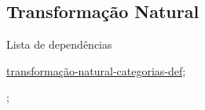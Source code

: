 \subsection{Transformação Natural}
\label{transformação-natural-categorias-ex}
\begin{titlemize}{Lista de dependências}
	\item \hyperref[transformação-natural-categorias-def]{transformação-natural-categorias-def};\\ %
	\item \hyperref[]{};\\
\end{titlemize}

